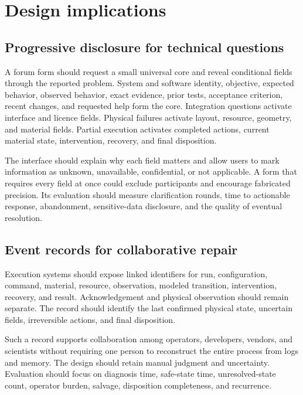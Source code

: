 \section{Design implications}

\subsection{Progressive disclosure for technical questions}

A forum form should request a small universal core and reveal conditional fields through the reported problem. System and software identity, objective, expected behavior, observed behavior, exact evidence, prior tests, acceptance criterion, recent changes, and requested help form the core. Integration questions activate interface and licence fields. Physical failures activate layout, resource, geometry, and material fields. Partial execution activates completed actions, current material state, intervention, recovery, and final disposition.

The interface should explain why each field matters and allow users to mark information as unknown, unavailable, confidential, or not applicable. A form that requires every field at once could exclude participants and encourage fabricated precision. Its evaluation should measure clarification rounds, time to actionable response, abandonment, sensitive-data disclosure, and the quality of eventual resolution.

\subsection{Event records for collaborative repair}

Execution systems should expose linked identifiers for run, configuration, command, material, resource, observation, modeled transition, intervention, recovery, and result. Acknowledgement and physical observation should remain separate. The record should identify the last confirmed physical state, uncertain fields, irreversible actions, and final disposition.

Such a record supports collaboration among operators, developers, vendors, and scientists without requiring one person to reconstruct the entire process from logs and memory. The design should retain manual judgment and uncertainty. Evaluation should focus on diagnosis time, safe-state time, unresolved-state count, operator burden, salvage, disposition completeness, and recurrence.

